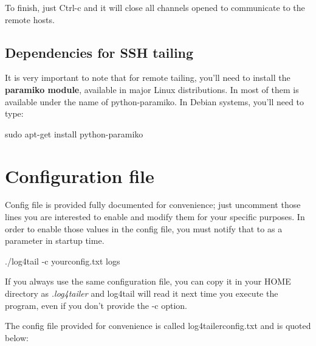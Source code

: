 To finish, just Ctrl-c and it will close all channels opened to communicate to
the remote hosts. 

\subsection{Dependencies for SSH tailing}
It is very important to note that for remote tailing, you'll need to install
the \textbf{paramiko module}, available in major Linux distributions. In most
of them is available under the name of python-paramiko. In Debian systems,
you'll need to type:
\begin{cmd}
 sudo apt-get install python-paramiko
\end{cmd}

\section{Configuration file}
Config file is provided fully documented for convenience; just uncomment those
lines you are interested to enable and modify them for your specific purposes.
In order to enable those values in the config file, you must notify that to
\logftailer{} as a parameter in startup time.

\begin{cmd}
 ./log4tail -c yourconfig.txt logs
\end{cmd}
If you always use the same configuration file, you can copy it in your HOME
directory as \emph{.log4tailer} and log4tail will read it next time you execute
the program, even if you don't provide the -c option.

The config file provided for convenience is called log4tailerconfig.txt and is quoted below:

